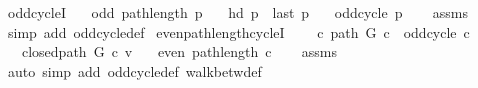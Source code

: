 \begin{isabellebody}
\endisatagproof
{\isafoldproof}%
%
\isadelimproof
\isanewline
%
\endisadelimproof
%
\isadeliminvisible
\isanewline
%
\endisadeliminvisible
%
\isataginvisible
{}\isamarkupfalse%
\ odd{\isacharunderscore}{\kern0pt}cycleI{\isacharcolon}{\kern0pt}\isanewline
\ \ \ {\isachardoublequoteopen}odd\ {\isacharparenleft}{\kern0pt}path{\isacharunderscore}{\kern0pt}length\ p{\isacharparenright}{\kern0pt}{\isachardoublequoteclose}\isanewline
\ \ \ {\isachardoublequoteopen}hd\ p\ {\isacharequal}{\kern0pt}\ last\ p{\isachardoublequoteclose}\isanewline
\ \ \ {\isachardoublequoteopen}odd{\isacharunderscore}{\kern0pt}cycle\ p{\isachardoublequoteclose}%
\endisataginvisible
{\isafoldinvisible}%
%
\isadeliminvisible
\isanewline
%
\endisadeliminvisible
%
\isadelimproof
\ \ %
\endisadelimproof
%
\isatagproof
{}\isamarkupfalse%
\ assms\isanewline
\ \ \isamarkupfalse%
\ {\isacharparenleft}{\kern0pt}simp\ add{\isacharcolon}{\kern0pt}\ odd{\isacharunderscore}{\kern0pt}cycle{\isacharunderscore}{\kern0pt}def{\isacharparenright}{\kern0pt}%
\endisatagproof
{\isafoldproof}%
%
\isadelimproof
\isanewline
%
\endisadelimproof
%
\isadeliminvisible
\isanewline
%
\endisadeliminvisible
%
\isataginvisible
{}\isamarkupfalse%
\ even{\isacharunderscore}{\kern0pt}path{\isacharunderscore}{\kern0pt}length{\isacharunderscore}{\kern0pt}cycleI{\isacharcolon}{\kern0pt}\isanewline
\ \ \ {\isachardoublequoteopen}{\isasymnot}\ {\isacharparenleft}{\kern0pt}{\isasymexists}c{\isachardot}{\kern0pt}\ path\ G\ c\ {\isasymand}\ odd{\isacharunderscore}{\kern0pt}cycle\ c{\isacharparenright}{\kern0pt}{\isachardoublequoteclose}\isanewline
\ \ \ {\isachardoublequoteopen}closed{\isacharunderscore}{\kern0pt}path\ G\ c\ v{\isachardoublequoteclose}\isanewline
\ \ \ {\isachardoublequoteopen}even\ {\isacharparenleft}{\kern0pt}path{\isacharunderscore}{\kern0pt}length\ c{\isacharparenright}{\kern0pt}{\isachardoublequoteclose}%
\endisataginvisible
{\isafoldinvisible}%
%
\isadeliminvisible
\isanewline
%
\endisadeliminvisible
%
\isadelimproof
\ \ %
\endisadelimproof
%
\isatagproof
{}\isamarkupfalse%
\ assms\isanewline
\ \ \isamarkupfalse%
\ {\isacharparenleft}{\kern0pt}auto\ simp\ add{\isacharcolon}{\kern0pt}\ odd{\isacharunderscore}{\kern0pt}cycle{\isacharunderscore}{\kern0pt}def\ walk{\isacharunderscore}{\kern0pt}betw{\isacharunderscore}{\kern0pt}def{\isacharparenright}{\kern0pt}%
\endisatagproof
{\isafoldproof}%
%
\isadelimproof
\isanewline
%
\endisadelimproof
%
\isadelimtheory
\isanewline
%
\endisadelimtheory
%
\isatagtheory
{}\isamarkupfalse%
%
\endisatagtheory
{\isafoldtheory}%
%
\isadelimtheory
%
\endisadelimtheory
%
\end{isabellebody}%
